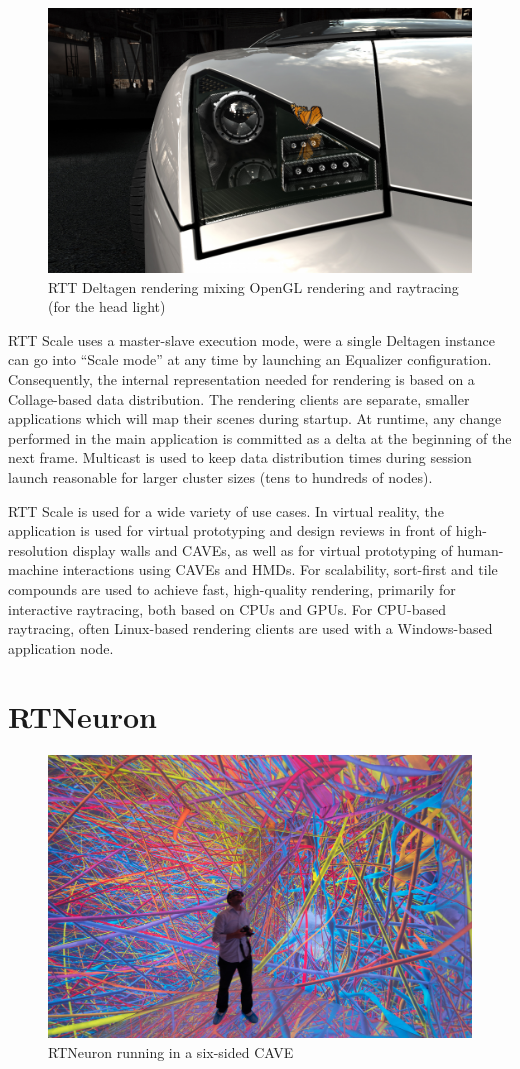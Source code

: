 \begin{figure}
  \includegraphics[width=.618\textwidth]{images/DeltaGen}
  {\caption{\label{fDeltaGen}RTT Deltagen rendering mixing OpenGL rendering and raytracing (for the head light)}}
\end{figure}

RTT Scale uses a master-slave execution mode, were a single Deltagen instance
can go into ``Scale mode'' at any time by launching an \textsf{Equalizer}
configuration. Consequently, the internal representation needed for rendering
is based on a \textsf{Collage}-based data distribution. The rendering clients
are separate, smaller applications which will map their scenes during startup.
At runtime, any change performed in the main application is committed as a
delta at the beginning of the next frame. Multicast is used to keep data
distribution times during session launch reasonable for larger cluster sizes
(tens to hundreds of nodes).

RTT Scale is used for a wide variety of use cases. In virtual reality, the
application is used for virtual prototyping and design reviews in front of
high-resolution display walls and CAVEs, as well as for virtual prototyping of
human-machine interactions using CAVEs and HMDs. For scalability, sort-first and
tile compounds are used to achieve fast, high-quality rendering, primarily for
interactive raytracing, both based on CPUs and GPUs. For CPU-based raytracing,
often Linux-based rendering clients are used with a Windows-based application
node.

\section{RTNeuron}

\begin{figure}
  \includegraphics[width=.618\textwidth]{images/RTNeuron}
  {\caption{\label{fRTNeuron}RTNeuron running in a six-sided CAVE}}
\end{figure}


